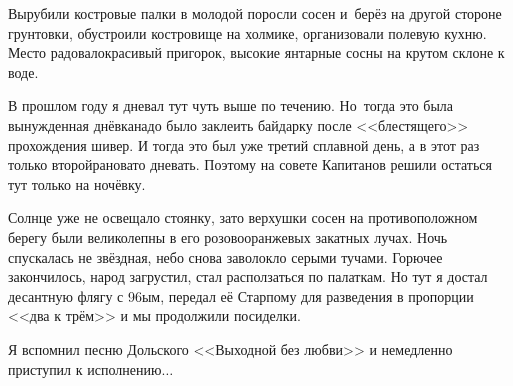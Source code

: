 Вырубили костровые палки в молодой поросли сосен и~берёз на другой стороне грунтовки, обустроили костровище на холмике, организовали полевую кухню. Место радовало\mdash красивый пригорок, высокие янтарные сосны на крутом склоне к воде. %

В прошлом году я дневал тут чуть выше по течению. Но~тогда это была вынужденная днёвка\mdash  надо было заклеить байдарку после <<блестящего>> прохождения шивер. И тогда это был уже третий сплавной день, а в этот раз только второй\mdash рановато дневать. Поэтому на совете Капитанов решили остаться тут только на ночёвку.

Солнце уже не освещало стоянку, зато верхушки сосен на противоположном берегу были великолепны в его розово\sdash оранжевых закатных лучах. Ночь спускалась не звёздная, небо снова заволокло серыми тучами. Горючее закончилось, народ загрустил, стал расползаться по палаткам. Но тут я достал десантную флягу с 96\sdash ым, передал её Старпому для разведения в пропорции <<два к трём>> и мы продолжили посиделки. 

Я вспомнил песню Дольского <<Выходной без любви>> и немедленно приступил к исполнению$\ldots$  

